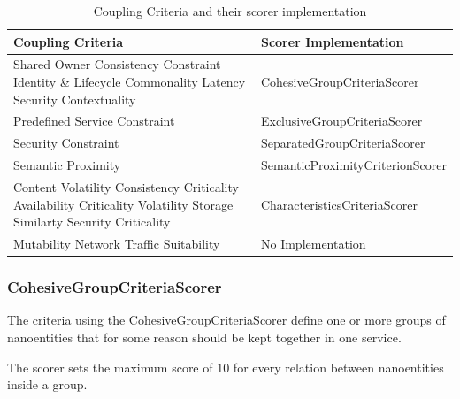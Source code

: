 \begin{table}[H]
	\centering
	\caption{Coupling Criteria and their scorer implementation}
	\label{tab:scorer}
	\begin{tabular}{|p{170pt}|p{200pt}|}
		\hline	
		\textbf{Coupling Criteria} & \textbf{Scorer Implementation}  \\
		\hline
		Shared Owner \newline Consistency Constraint \newline Identity \& Lifecycle Commonality \newline Latency \newline Security Contextuality & CohesiveGroupCriteriaScorer \\
		\hline
		Predefined Service Constraint  & ExclusiveGroupCriteriaScorer \\ 
		\hline
		Security Constraint & SeparatedGroupCriteriaScorer \\
		\hline
		Semantic Proximity & SemanticProximityCriterionScorer \\
		\hline
		Content Volatility \newline Consistency Criticality \newline Availability Criticality \newline Volatility \newline Storage Similarty \newline Security Criticality & CharacteristicsCriteriaScorer  \\
		\hline
		Mutability \newline Network Traffic Suitability  & No Implementation  \\
		\hline
	\end{tabular}
\end{table}



\subsubsection{CohesiveGroupCriteriaScorer}

The criteria using the CohesiveGroupCriteriaScorer define one or more groups of nanoentities that for some reason should be kept together in one service.

The scorer sets the maximum score of $10$ for every relation between nanoentities inside a group. 

